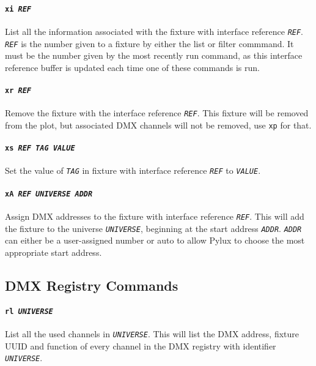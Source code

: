 \documentclass[a4paper]{article}
\begin{document}
\paragraph{\texttt{xi \textit{REF}}}
List all the information associated with the fixture with interface reference 
\texttt{\textit{REF}}. \texttt{\textit{REF}} is the number given to a fixture 
by either the list or filter commmand. It must be the number given by the most 
recently run command, as this interface reference buffer is updated each time 
one of these commands is run.

\paragraph{\texttt{xr \textit{REF}}}
Remove the fixture with the interface reference \texttt{\textit{REF}}. This 
fixture will be removed from the plot, but associated DMX channels will not be 
removed, use \texttt{xp} for that.

\paragraph{\texttt{xs \textit{REF TAG VALUE}}}
Set the value of \texttt{\textit{TAG}} in fixture with interface reference 
\texttt{\textit{REF}} to \texttt{\textit{VALUE}}.

\paragraph{\texttt{xA \textit{REF UNIVERSE ADDR}}}
Assign DMX addresses to the fixture with interface reference 
\texttt{\textit{REF}}. This will add the fixture to the universe 
\texttt{\textit{UNIVERSE}}, beginning at the start address 
\texttt{\textit{ADDR}}. \texttt{\textit{ADDR}} can either be a user-assigned 
number or auto to allow Pylux to choose the most appropriate start address.

\subsection{DMX Registry Commands}

\paragraph{\texttt{rl \textit{UNIVERSE}}}
List all the used channels in \texttt{\textit{UNIVERSE}}. This will list the 
DMX address, fixture UUID and function of every channel in the DMX registry 
with identifier \texttt{\textit{UNIVERSE}}.
\end{document}
